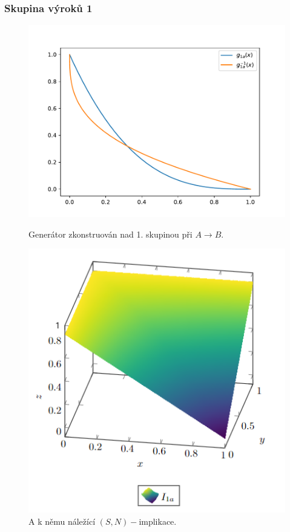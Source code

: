 \subsubsection{Skupina výrok\r u 1}

    
\begin{figure}[H]
              \centering
              \begin{minipage}[b]{0.45\textwidth}
                \includegraphics[width=\textwidth]{template-fig/p0.pdf}
                \caption{Generátor zkonstruován nad 1. skupinou při $A \to B.$ }
              \end{minipage}
              \hfill
              \begin{minipage}[b]{0.4\textwidth}
                \includegraphics[width=\textwidth]{template-fig/i0.png}
                \caption{A k němu náležící $(S,N)-$implikace.}
              \end{minipage}
            \end{figure}


